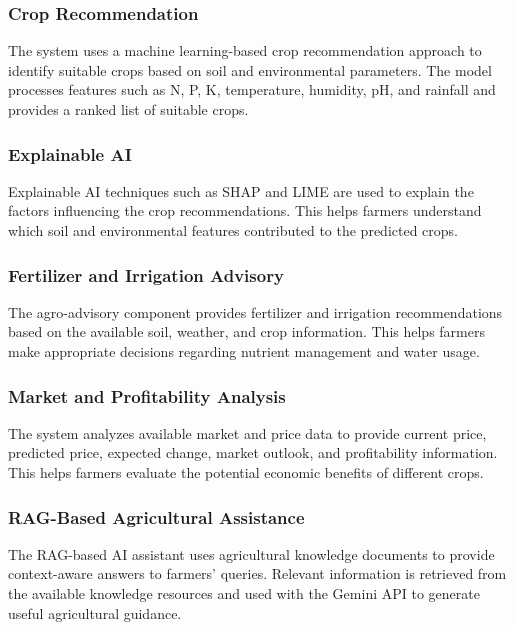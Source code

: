\subsubsection{Crop Recommendation}

The system uses a machine learning-based crop recommendation approach to
identify suitable crops based on soil and environmental parameters. The model
processes features such as N, P, K, temperature, humidity, pH, and rainfall and
provides a ranked list of suitable crops.

\subsubsection{Explainable AI}

Explainable AI techniques such as SHAP and LIME are used to explain the factors
influencing the crop recommendations. This helps farmers understand which soil
and environmental features contributed to the predicted crops.

\subsubsection{Fertilizer and Irrigation Advisory}

The agro-advisory component provides fertilizer and irrigation recommendations
based on the available soil, weather, and crop information. This helps farmers
make appropriate decisions regarding nutrient management and water usage.

\subsubsection{Market and Profitability Analysis}

The system analyzes available market and price data to provide current price,
predicted price, expected change, market outlook, and profitability information.
This helps farmers evaluate the potential economic benefits of different crops.

\subsubsection{RAG-Based Agricultural Assistance}

The RAG-based AI assistant uses agricultural knowledge documents to provide
context-aware answers to farmers' queries. Relevant information is retrieved
from the available knowledge resources and used with the Gemini API to generate
useful agricultural guidance.